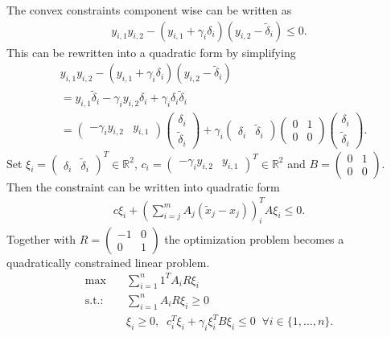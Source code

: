 The convex constraints component wise can be written as
\begin{align}
    y_{i,1}y_{i,2} - (y_{i,1}+\gamma_i \delta_i)(y_{i,2}-\tilde{\delta}_i)
    \le 0.
\end{align}
This can be rewritten into a quadratic form by simplifying
\begin{align}
    &y_{i,1}y_{i,2} - (y_{i,1}+\gamma_i \delta_i)(y_{i,2}-\tilde{\delta}_i) \\
    &=y_{i,1}\tilde{\delta}_i - \gamma_i y_{i,2}\delta_i +
    \gamma_i\delta_i\tilde{\delta}_i \\
    & =
    \begin{pmatrix} -\gamma_i y_{i,2} & y_{i,1} \end{pmatrix}
    \begin{pmatrix} \delta_i \\ \tilde{\delta}_i \end{pmatrix}
    +\gamma_i
    \begin{pmatrix} \delta_i & \tilde{\delta}_i \end{pmatrix}
   \begin{pmatrix} 0 & 1 \\ 0 & 0 \end{pmatrix}
    \begin{pmatrix} \delta_i \\ \tilde{\delta}_i \end{pmatrix}.
\end{align}
Set $\xi_i = \begin{pmatrix} \delta_i & \tilde{\delta}_i\end{pmatrix} ^{T}
\in \mathbb{R}^{2}$, $c_i = \begin{pmatrix} -\gamma_iy_{i,2}&
    y_{i,1}\end{pmatrix}^{T} \in \mathbb{R}^{2}$ and $B = \begin{pmatrix} 0 &
1\\ 0 & 0\end{pmatrix}$. Then the constraint can be written into quadratic
form
\begin{align}
    c\xi_i + \left(\sum_{i=j}^{m} A_j(\tilde{x}_j-x_j)\right)_i^{T} A\xi_i \le 0.
\end{align}
Together with $R = \begin{pmatrix} -1 & 0 \\ 0 & 1 \end{pmatrix}$ the
optimization problem becomes a quadratically constrained linear problem.
\begin{align}
    \text{max} \quad & \sum_{i=1}^{n}1^{T}A_iR\xi_i \label{eq: quadratically_constrained}\\
    \text{s.t.:}\quad
          & \sum_{i=1}^{n}A_iR\xi_i \ge 0 \\
          & \xi_i \ge 0, \;\;
          c_i^{T} \xi_i + \gamma_i \xi_i^{T} B\xi_i \le 0
          \;\; \forall i \in \{1,\ldots,n\}.
\end{align}
